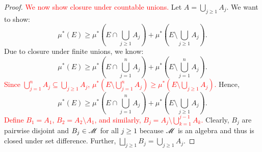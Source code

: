 \begin{proof}
    \textcolor{red}{We now show closure under countable unions.} Let $A = \bigcup_{j \geq 1} A_j$. We want to show: 
    \[ \mu^*(E) \geq \mu^*\left(E \cap \bigcup_{j \geq 1} A_j \right) + \mu^*\left( E \setminus \bigcup_{j \geq 1} A_j\right).\]
    Due to closure under finite unions, we know:
    \[ \mu^*(E) \geq \mu^*\left( E \cap \bigcup_{j = 1}^n A_j \right) +  \mu^*\left( E \setminus \bigcup_{j = 1}^{n} A_j\right).\]
    \textcolor{red}{Since $\bigcup_{j=1}^{n} A_j \subseteq\bigcup_{j \geq 1} A_j$, $\mu^*\left(E \setminus \bigcup_{j=1}^n A_j\right) \geq \mu^*\left(E \setminus \bigcup_{j \geq 1} A_j\right)$.} Hence, 
    \begin{equation}
    \mu^*(E) \geq \mu^*\left( E \cap \bigcup_{j = 1}^n A_j \right) +  \mu^*\left( E \setminus \bigcup_{j \geq 1} A_j\right).
    \end{equation}
    \textcolor{red}{Define $B_1 = A_1$, $B_2 = A_2 \setminus A_1$, and similarly, $B_j = A_j \setminus \bigcup_{k = 1} ^ {j - 1} A_k$.} Clearly, $B_j$ are pairwise disjoint and $B_j \in \mathscr{M}$ for all $j \geq 1$ because $\mathscr{M}$ is an algebra and thus is closed under set difference. Further, $\bigsqcup_{j \geq 1} B_j = \bigcup_{j \geq 1} A_j$.
    

\end{proof}
